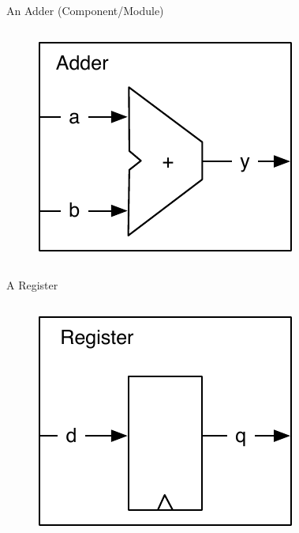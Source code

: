 \begin{frame}[fragile]{An Adder (Component/Module)}
\begin{columns}
\begin{column}{0.4\textwidth}
\begin{figure}
  \includegraphics[scale=\scale]{../figures/components-adder}
\end{figure}
\end{column}
\begin{column}{0.6\textwidth}
\end{column}
\end{columns}
\end{frame}

\begin{frame}[fragile]{A Register}
\begin{columns}
\begin{column}{0.4\textwidth}
\begin{figure}
  \includegraphics[scale=\scale]{../figures/components-register}
\end{figure}
\end{column}
\begin{column}{0.6\textwidth}
\end{column}
\end{columns}
\end{frame}


